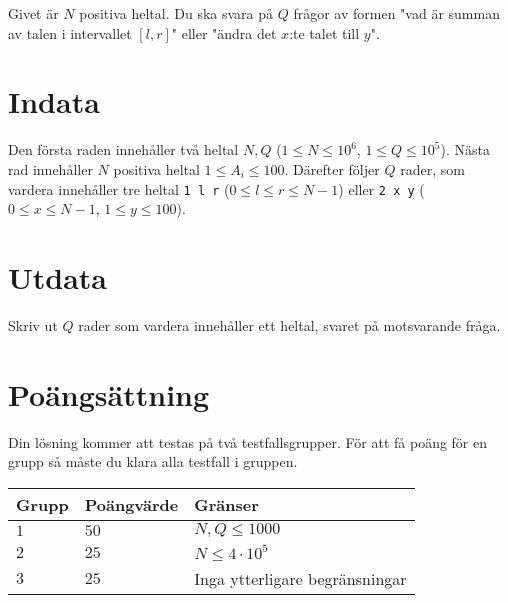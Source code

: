 Givet är $N$ positiva heltal. Du ska svara på $Q$ frågor av formen "vad är summan av talen i intervallet $[l,r]$" eller "ändra det $x$:te talet till $y$".

\section*{Indata}
Den första raden innehåller två heltal $N, Q$ ($1 \leq N \leq 10^6$, $1 \leq Q \leq 10^5$).
Nästa rad innehåller $N$ positiva heltal $1 \leq A_i \leq 100$.
Därefter följer $Q$ rader, som vardera innehåller tre heltal \texttt{1 l r} ($0 \leq l \leq r \leq N-1$) eller \texttt{2 x y} ($0 \leq x \leq N-1$, $1 \leq y \leq 100$).

\section*{Utdata}
Skriv ut $Q$ rader som vardera innehåller ett heltal, svaret på motsvarande fråga.

\section*{Poängsättning}
Din lösning kommer att testas på två testfallsgrupper.
\noindent
För att få poäng för en grupp så måste du klara alla testfall i gruppen.

\noindent
\begin{tabular}{| l | l | l |}
\hline
  Grupp & Poängvärde & Gränser \\ \hline
  $1$    & $50$       &  $N,Q \leq 1000$ \\ \hline
  $2$    & $25$       &  $N \leq 4 \cdot 10^5$ \\ \hline
  $3$    & $25$       &  Inga ytterligare begränsningar \\ \hline
\end{tabular}
